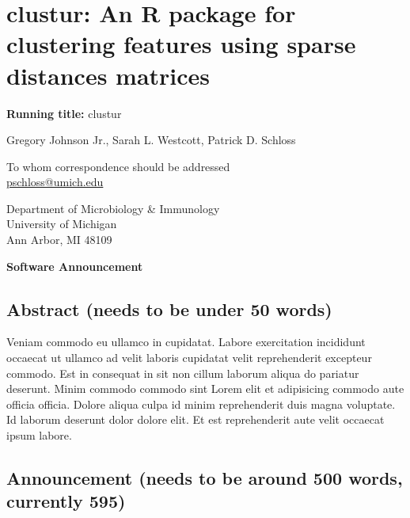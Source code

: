 \documentclass[
  11pt,
]{article}
\author{}
\date{}
\begin{document}
\raggedright

\section{clustur: An R package for clustering features using sparse
distances
matrices}\label{clustur-an-r-package-for-clustering-features-using-sparse-distances-matrices}

\vspace{20mm}

\textbf{Running title:} clustur

\vspace{20mm}

Gregory Johnson Jr.\text, Sarah L. Westcott, Patrick D.
Schloss\textsuperscript{\textdagger}

\vspace{25mm}

\textdagger To whom correspondence should be addressed\\
\href{mailto:pschloss@umich.edu}{pschloss@umich.edu}

\vspace{10mm}

Department of Microbiology \& Immunology\\
University of Michigan\\
Ann Arbor, MI 48109

\vspace{20mm}

\textbf{Software Announcement}

\newpage

\subsection{Abstract (needs to be under 50
words)}\label{abstract-needs-to-be-under-50-words}

Veniam commodo eu ullamco in cupidatat. Labore exercitation incididunt
occaecat ut ullamco ad velit laboris cupidatat velit reprehenderit
excepteur commodo. Est in consequat in sit non cillum laborum aliqua do
pariatur deserunt. Minim commodo commodo sint Lorem elit et adipisicing
commodo aute officia officia. Dolore aliqua culpa id minim reprehenderit
duis magna voluptate. Id laborum deserunt dolor dolore elit. Et est
reprehenderit aute velit occaecat ipsum labore.

\newpage

\subsection{Announcement (needs to be around 500 words, currently
595)}\label{announcement-needs-to-be-around-500-words-currently-595}
\end{document}
